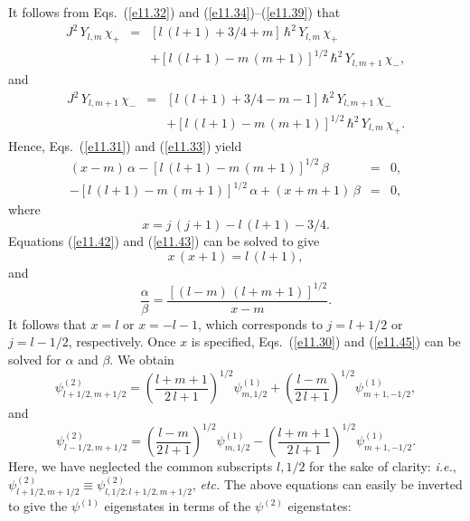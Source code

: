 It follows from Eqs.~(\ref{e11.32}) and (\ref{e11.34})--(\ref{e11.39}) that
\begin{eqnarray}
J^2\,Y_{l,m}\,\chi_+&=& [l\,(l+1)+3/4+m]\,\hbar^2\,Y_{l,m}\,\chi_+\nonumber\\[0.5ex]
&&+ [l\,(l+1)-m\,(m+1)]^{1/2}\,\hbar^2\,Y_{l,m+1}\,\chi_-,
\end{eqnarray}
and
\begin{eqnarray}
J^2\,Y_{l,m+1}\,\chi_-&=& [l\,(l+1)+3/4-m-1]\,\hbar^2\,Y_{l,m+1}\,\chi_-\nonumber\\[0.5ex]
&&+ [l\,(l+1)-m\,(m+1)]^{1/2}\,\hbar^2\,Y_{l,m}\,\chi_+.
\end{eqnarray}
Hence, Eqs.~(\ref{e11.31}) and (\ref{e11.33}) yield
\begin{eqnarray}\label{e11.42}
(x - m)\,\alpha - [l\,(l+1)-m\,(m+1)]^{1/2}\,\beta &=& 0,\\[0.5ex]
-[l\,(l+1)-m\,(m+1)]^{1/2}\,\alpha +(x+m+1)\,\beta&=& 0,\label{e11.43}
\end{eqnarray}
where 
\begin{equation}
x = j\,(j+1) - l\,(l+1) - 3/4.
\end{equation}
Equations (\ref{e11.42}) and (\ref{e11.43}) can be solved to give
\begin{equation}
x\,(x+1) = l\,(l+1),
\end{equation}
and
\begin{equation}\label{e11.45}
\frac{\alpha}{\beta} = \frac{[(l-m)\,(l+m+1)]^{1/2}}{x-m}.
\end{equation}
It follows that $x=l$ or $x=-l-1$, which corresponds to $j=l+1/2$ or
$j=l-1/2$, respectively. Once $x$ is specified, Eqs.~(\ref{e11.30}) and (\ref{e11.45}) can be solved for $\alpha$ and $\beta$. We obtain
\begin{equation}\label{e11.47}
\psi^{(2)}_{l+1/2,m+1/2} = \left(\frac{l+m+1}{2\,l+1}\right)^{1/2}
\psi^{(1)}_{m,1/2} + \left(\frac{l-m}{2\,l+1}\right)^{1/2}\psi^{(1)}_{m+1,-1/2},
\end{equation}
and
\begin{equation}\label{e11.48}
\psi^{(2)}_{l-1/2,m+1/2} = \left(\frac{l-m}{2\,l+1}\right)^{1/2}
\psi^{(1)}_{m,1/2} -\left(\frac{l+m+1}{2\,l+1}\right)^{1/2}\psi^{(1)}_{m+1,-1/2}.
\end{equation}
Here, we have neglected the common subscripts $l,1/2$ for the sake of
clarity: {\em i.e.}, $\psi^{(2)}_{l+1/2,m+1/2}\equiv \psi^{(2)}_{l,1/2;l+1/2,m+1/2}$, {\em etc.} The above equations can easily be inverted
to give the $\psi^{(1)}$ eigenstates in terms of the $\psi^{(2)}$ eigenstates:
